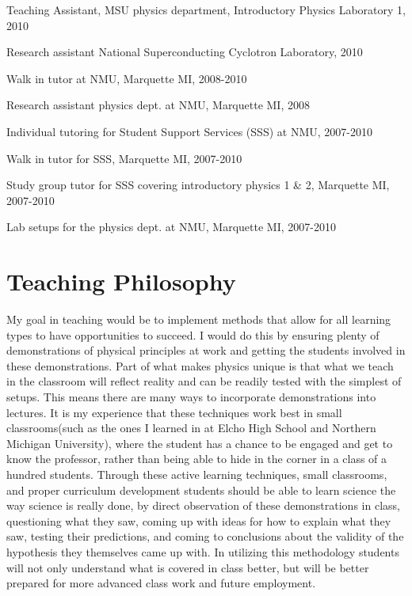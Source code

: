\documentclass{article}
\begin{document}
Teaching Assistant, MSU physics department, Introductory Physics Laboratory 1, 2010

Research assistant National Superconducting Cyclotron Laboratory, 2010

Walk in tutor at NMU, Marquette MI, 2008-2010

Research assistant physics dept. at NMU, Marquette MI, 2008

Individual tutoring for Student Support Services (SSS) at NMU, 2007-2010

Walk in tutor for SSS, Marquette MI, 2007-2010

Study group tutor for SSS covering introductory physics 1 \& 2, Marquette MI, 2007-2010

Lab setups for the physics dept. at NMU, Marquette MI, 2007-2010


\newpage
\section{Teaching Philosophy}
My goal in teaching would be to implement methods that allow for all learning types to have opportunities to succeed. I would do this by ensuring plenty of demonstrations of physical principles at work and getting the students involved in these demonstrations. Part of what makes physics unique is that what we teach in the classroom will reflect reality and can be readily tested with the simplest of setups. This means there are many ways to incorporate demonstrations into lectures. It is my experience that these techniques work best in small classrooms(such as the ones I learned in at Elcho High School and Northern Michigan University), where the student has a chance to be engaged and get to know the professor, rather than being able to hide in the corner in a class of a hundred students. Through these active learning techniques, small classrooms, and proper curriculum development students should be able to learn science the way science is really done, by direct observation of these demonstrations in class, questioning what they saw, coming up with ideas for how to explain what they saw, testing their predictions, and coming to conclusions about the validity of the hypothesis they themselves came up with. In utilizing this methodology students will not only understand what is covered in class better, but will be better prepared for more advanced class work and future employment. 
\end{document}
